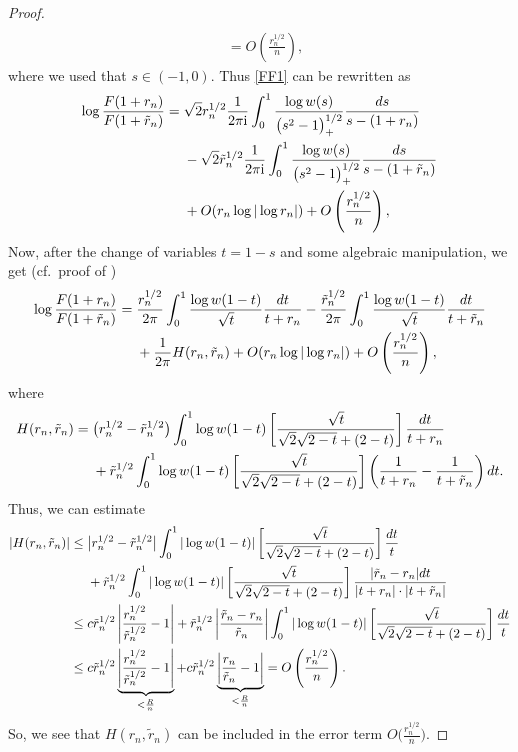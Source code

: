 \documentclass[11pt]{article}
\numberwithin{equation}{section}
\newcommand{\I}{\mathrm{i}}
\numberwithin{equation}{section}
\begin{document}
\begin{proof}
\begin{align*}
 \\
 &= O\left(\frac{r_n^{1/2}}{n}\right),
\end{align*}
where we used that $s\in (-1,0)$. Thus \eqref{FF1} can be rewritten as
\begin{align*}
 \log \frac{F(1+r_n)}{F(1+\tilde r_n)}={}&
 \sqrt{2} r_n^{1/2} \frac{1}{2\pi \I}\int_{0}^1 \frac{\log w(s)}{\big(s^2-1\big)_+^{1/2}} \frac{{\rm d}s}{s-(1+r_n)}\\
 &-\sqrt{2} \tilde r_n^{1/2} \frac{1}{2\pi \I}\int_{0}^1 \frac{\log w(s)}{\big(s^2-1\big)_+^{1/2}} \frac{{\rm d}s}{s-(1+\tilde r_n)}
\\&+O(r_n \log |\log r_n|) + O\left(\frac{r_n^{1/2}}{n}\right),
\end{align*}
Now, after the change of variables $t = 1- s$ and some algebraic manipulation, we get (cf.\ proof of \cite[Proposition~A.4]{CD})
\begin{align}\nonumber
 \log \frac{F(1+r_n)}{F(1+\tilde r_n)}={}& \frac{r_n^{1/2}}{2\pi} \int_0^1 \frac{\log w(1-t)}{\sqrt{t}} \frac{{\rm d}t}{t+r_n} - \frac{\tilde r_n^{1/2}}{2\pi} \int_0^1 \frac{\log w(1-t)}{\sqrt{t}} \frac{{\rm d}t}{t+\tilde r_n} \\\label{logFF}
 &+ \frac{1}{2\pi} H(r_n, \tilde r_n) +O(r_n \log |\log r_n|) + O\left(\frac{r_n^{1/2}}{n}\right),
\end{align}
where
\begin{align*}
 H(r_n, \tilde r_n)={}& \big(r_n^{1/2}-\tilde r_n^{1/2}\big)\int_0^1 \log w(1-t) \left[\frac{\sqrt{t}}{\sqrt{2}\sqrt{2-t}+(2-t)} \right]\frac{{\rm d}t}{t+r_n}
 \\
 &+ \tilde r_n^{1/2} \int_0^1 \log w(1-t) \left[\frac{\sqrt{t}}{\sqrt{2}\sqrt{2-t}+(2-t)} \right]\left(\frac{1}{t+r_n}-\frac{1}{t+\tilde r_n}\right){\rm d}t.
\end{align*}
Thus, we can estimate
\begin{align*}
 |H(r_n, \tilde r_n)|\leq{}& \big|r_n^{1/2}-\tilde r_n^{1/2}\big| \int_0^1 |\log w(1-t)|\left[\frac{\sqrt{t}}{\sqrt{2}\sqrt{2-t}+(2-t)} \right]\frac{{\rm d}t}{t}
 \\
 &+\tilde r_n^{1/2} \int_0^1 |\log w(1-t)|\left[\frac{\sqrt{t}}{\sqrt{2}\sqrt{2-t}+(2-t)} \right]\frac{|\tilde r_n - r_n|{\rm d}t}{|t+r_n|\cdot |t+\tilde r_n|}
 \\
\leq{}& c \tilde r_n^{1/2} \left|\frac{r_n^{1/2}}{\tilde r_n^{1/2}}-1\right| + \tilde r_n^{1/2}\left|\frac{\tilde r_n - r_n}{\tilde r_n}\right| \int_0^1 |\log w(1-t)|\left[\frac{\sqrt{t}}{\sqrt{2}\sqrt{2-t}+(2-t)} \right]\frac{{\rm d}t}{t}
 \\
\leq{}& c \tilde r_n^{1/2} \underbrace{\left|\frac{r_n^{1/2}}{\tilde r_n^{1/2}}-1\right|}_{<\frac{R}{n}} + c \tilde r_n^{1/2} \underbrace{\left|\frac{r_n}{\tilde r_n}-1\right|}_{<\frac{R}{n}} = O\left(\frac{r_n^{1/2}}{n}\right).
\end{align*}
So, we see that $H(r_n, \tilde r_n)$ can be included in the error term $O\big(\frac{r_n^{1/2}}{n}\big)$.


\end{proof}
\end{document}
